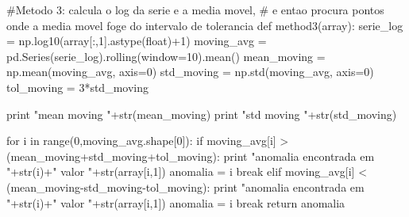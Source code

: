 \documentclass{article}
\begin{document}
\newpage
\begin{tcolorbox}
\begin{python}
#Metodo 3: calcula o log da serie e a media movel,
# e entao procura pontos onde a media movel foge do intervalo de tolerancia
def method3(array):
	serie_log = np.log10(array[:,1].astype(float)+1)
	moving_avg = pd.Series(serie_log).rolling(window=10).mean()
	mean_moving = np.mean(moving_avg, axis=0)
	std_moving = np.std(moving_avg, axis=0)
	tol_moving = 3*std_moving

	print "mean moving "+str(mean_moving)
	print "std moving "+str(std_moving)

	for i in range(0,moving_avg.shape[0]):
		if moving_avg[i] > (mean_moving+std_moving+tol_moving):
			print "anomalia encontrada em "+str(i)+" valor "+str(array[i,1])
			anomalia = i
			break
		elif moving_avg[i] < (mean_moving-std_moving-tol_moving):
			print "anomalia encontrada em "+str(i)+" valor "+str(array[i,1])
			anomalia = i
			break
	return anomalia

\end{python}
\end{tcolorbox}

\newpage
\end{document}

